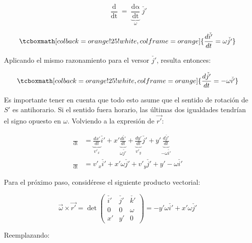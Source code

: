 \documentclass{article}
\begin{document}
\begin{equation}
\frac{ \mathop{d \check{i'} } }{ \mathop{dt} } = \underbrace{ \frac{ \mathop{d\alpha} }{\mathop{dt}} }_{\omega} \check{j'}
\end{equation}

\begin{equation}
\tcboxmath[colback=orange!25!white,colframe=orange]{
\frac{ \mathop{d \check{i'} } }{ \mathop{dt} } = \omega \check{j'}
}
\end{equation}

Aplicando el mismo razonamiento para el versor $\check{j'}$, resulta entonces:

\begin{equation}
\tcboxmath[colback=orange!25!white,colframe=orange]{
\frac{ \mathop{d \check{j'} } }{ \mathop{dt} } = -\omega \check{i'}
}
\end{equation}

Es importante tener en cuenta que todo esto asume que el sentido de rotación de $S'$ es antihorario. Si el sentido fuera horario, las últimas dos igualdades tendrían el signo opuesto en $\omega$. Volviendo a la expresión de $\overrightarrow{r'}$:

\begin{subequations}
\begin{align}
\frac{ \mathop{ \overrightarrow{dr'} } }{ \mathop{dt} } &= \underbrace{ \frac{dx'}{dt} }_{v'_x} \check{i'} + x' \underbrace{ \frac{d\check{i'}}{dt} }_{\omega \check{j'}} + \underbrace{ \frac{dy'}{dt} }_{v'_y} \check{j'} + y' \underbrace{ \frac{d\check{j'}}{dt} }_{-\omega \check{i'}} \\
\frac{ \mathop{ \overrightarrow{dr'} } }{ \mathop{dt} } &= v'_x \check{i'} + x' \omega \check{j'} + v'_y \check{j'} + y' -\omega \check{i'}
\end{align}
\end{subequations}

Para el próximo paso, considérese el siguiente producto vectorial:

\begin{equation}
\overrightarrow{\omega} \times \overrightarrow{r'} = \det \begin{pmatrix}
\check{i'} & \check{j'} & \check{k'} \\
0 & 0 & \omega \\
x' & y' & 0
\end{pmatrix} = -y' \omega \check{i'} + x' \omega \check{j'}
\end{equation}

Reemplazando:
\end{document}
